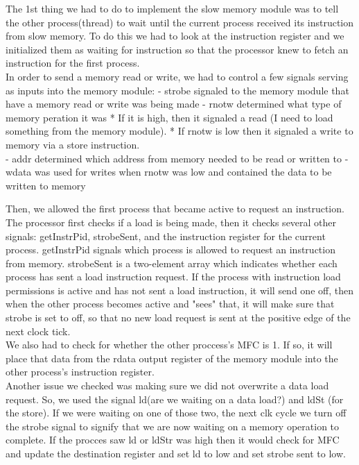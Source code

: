 \documentclass[12pt, twocolumn]{scrartcl}
\begin{document}
The 1st thing we had to do to implement the slow memory module was to tell the other process(thread) to wait until the current process received its instruction from slow memory. To do this we had to look at the instruction register and we initialized them as waiting for instruction so that the processor knew to fetch an instruction for the first process. \\

In order to send a memory read or write, we had to control a few signals serving as inputs into the memory module: 
 - strobe signaled to the memory module that have a memory read or write was being made
 - rnotw determined what type of memory peration it was
    * If it is high, then it signaled a read (I need to load something from the memory module). 
    * If rnotw is low then it signaled a write to memory via a store instruction. \\
 - addr determined which address from memory needed to be read or written to
 - wdata was used for writes when rnotw was low and contained the data to be written to memory

Then, we allowed the first process that became active to request an instruction. The processor first checks if a load is being made, then it checks several other signals: getInstrPid, strobeSent, and the instruction register for the current process. getInstrPid signals which process is allowed to request an instruction from memory. strobeSent is a two-element array which indicates whether each process has sent a load instruction request.  If the process with instruction load permissions is active and has not sent a load instruction, it will send one off, then when the other process becomes active and "sees" that, it will make sure that strobe is set to off, so that no new load request is sent at the positive edge of the next clock tick.  \\

We also had to check for whether the other proccess's MFC is 1. If so, it will place that data from the rdata output register of the memory module into the other process's instruction register. \\

Another issue we checked was making sure we did not overwrite a data load request. So, we used the signal ld(are we waiting on a data load?) and ldSt (for the store).  If we were waiting on one of those two, the next clk cycle we turn off the strobe signal to signify that we are now waiting on a memory operation to complete. If the procces saw ld or ldStr was high then it would check for MFC and update the destination register and set ld to low and set strobe sent to low. \\
\end{document}
